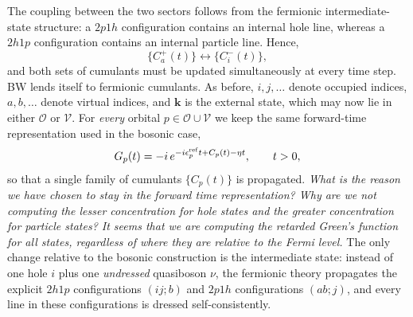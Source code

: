 The coupling between the two sectors follows from the fermionic intermediate-state structure: a $2p1h$ configuration contains an internal hole line, whereas a $2h1p$ configuration contains an internal particle line. Hence,
\begin{equation}
\{C_a^{+}(t)\}
\longleftrightarrow
\{C_i^{-}(t)\},
\end{equation}
and both sets of cumulants must be updated simultaneously at every time step.
BW lends itself to fermionic cumulants.
As before, $i,j,\ldots$ denote occupied indices, $a,b,\ldots$ denote virtual indices, and $\bm{k}$ is the external state, which may now lie in either $\mathcal{O}$ or $\mathcal{V}$. For \emph{every} orbital $p\in\mathcal{O}\cup\mathcal{V}$ we keep the same forward-time representation used in the bosonic case,
\begin{align}
G_p(t)=-i\,e^{-i\epsilon_p^{\rm ref}t+C_p(t)-\eta t},\qquad t>0,
\label{eq:Gferm}
\end{align}
so that a single family of cumulants $\{C_p(t)\}$ is propagated. \emph{What is the reason we have chosen to stay in the forward time representation? Why are we not computing the lesser concentration for hole states and the greater concentration for particle states? It seems that we are computing the retarded Green's function for all states, regardless of where they are relative to the Fermi level. }The only change relative to the bosonic construction is the intermediate state: instead of one hole $i$ plus one \emph{undressed} quasiboson $\nu$, the fermionic theory propagates the explicit $2h1p$ configurations $(ij;b)$ and $2p1h$ configurations $(ab;j)$, and every line in these configurations is dressed self-consistently.

